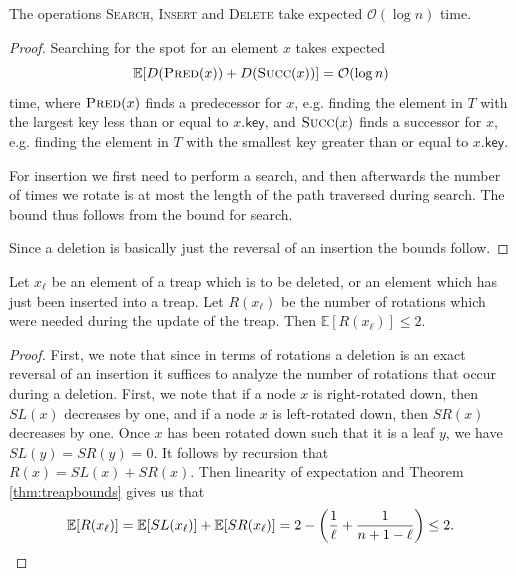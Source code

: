 \begin{lem} \label{lem:treapoperationsbounds}
The operations \textsc{Search}, \textsc{Insert} and \textsc{Delete} take expected $\mathcal{O}(\log n)$ time.
\end{lem}
\begin{proof}
Searching for the spot for an element $x$ takes expected
\[
    \mathbb{E}[D(\textsc{Pred}(x)) + D(\textsc{Succ}(x))] = \mathcal{O}(\log n)
\]
time, where $\textsc{Pred}(x)$ finds a predecessor for $x$, e.g. finding the element in $T$ with the largest key less than or equal to $x\textsf{.key}$, and $\textsc{Succ}(x)$ finds a successor for $x$, e.g. finding the element in $T$ with the smallest key greater than or equal to $x\textsf{.key}$.

For insertion we first need to perform a search, and then afterwards the number of times we rotate is at most the length of the path traversed during search. The bound thus follows from the bound for search.

Since a deletion is basically just the reversal of an insertion the bounds follow.
\end{proof}

\begin{lem} \label{lem:treaprotationbound}
Let $x_{\ell}$ be an element of a treap which is to be deleted, or an element which has just been inserted into a treap. Let $R(x_{\ell})$ be the number of rotations which were needed during the update of the treap. Then $\mathbb{E}[R(x_{\ell})] \leq 2$.
\end{lem}
\begin{proof}
First, we note that since in terms of rotations a deletion is an exact reversal of an insertion it suffices to analyze the number of rotations that occur during a deletion. First, we note that if a node $x$ is right-rotated down, then $SL(x)$ decreases by one, and if a node $x$ is left-rotated down, then $SR(x)$ decreases by one. Once $x$ has been rotated down such that it is a leaf $y$, we have $SL(y) = SR(y) = 0$. It follows by recursion that $R(x) = SL(x) + SR(x)$. Then linearity of expectation and Theorem \ref{thm:treapbounds} gives us that
\[
    \mathbb{E}[R(x_{\ell})] = \mathbb{E}[SL(x_{\ell})] + \mathbb{E}[SR(x_{\ell})] = 2 - \left(\frac{1}{\ell} + \frac{1}{n + 1 - \ell}\right) \leq 2.
\]
\end{proof}